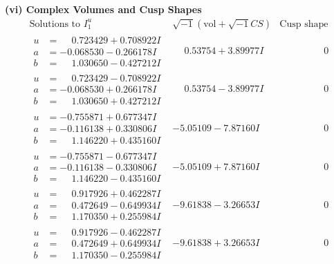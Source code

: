 \documentclass[1p]{elsarticle_modified}
\theoremstyle{definition}
\newcommand{\I}{\sqrt{-1}}
\begin{document}
\newpage\flushleft \textbf{(vi) Complex Volumes and Cusp Shapes}
$$\begin{array}{c|c|c}  
\text{Solutions to }I^u_{1}& \I (\text{vol} + \sqrt{-1}CS) & \text{Cusp shape}\\
 \hline 
\begin{aligned}
u &= \phantom{-}0.723429 + 0.708922 I \\
a &= -0.068530 - 0.266178 I \\
b &= \phantom{-}1.030650 - 0.427212 I\end{aligned}
 & \phantom{-}0.53754 + 3.89977 I & \phantom{-0.000000 } 0 \\ \hline\begin{aligned}
u &= \phantom{-}0.723429 - 0.708922 I \\
a &= -0.068530 + 0.266178 I \\
b &= \phantom{-}1.030650 + 0.427212 I\end{aligned}
 & \phantom{-}0.53754 - 3.89977 I & \phantom{-0.000000 } 0 \\ \hline\begin{aligned}
u &= -0.755871 + 0.677347 I \\
a &= -0.116138 + 0.330806 I \\
b &= \phantom{-}1.146220 + 0.435160 I\end{aligned}
 & -5.05109 - 7.87160 I & \phantom{-0.000000 } 0 \\ \hline\begin{aligned}
u &= -0.755871 - 0.677347 I \\
a &= -0.116138 - 0.330806 I \\
b &= \phantom{-}1.146220 - 0.435160 I\end{aligned}
 & -5.05109 + 7.87160 I & \phantom{-0.000000 } 0 \\ \hline\begin{aligned}
u &= \phantom{-}0.917926 + 0.462287 I \\
a &= \phantom{-}0.472649 - 0.649934 I \\
b &= \phantom{-}1.170350 + 0.255984 I\end{aligned}
 & -9.61838 - 3.26653 I & \phantom{-0.000000 } 0 \\ \hline\begin{aligned}
u &= \phantom{-}0.917926 - 0.462287 I \\
a &= \phantom{-}0.472649 + 0.649934 I \\
b &= \phantom{-}1.170350 - 0.255984 I\end{aligned}
 & -9.61838 + 3.26653 I & \phantom{-0.000000 } 0 \\ \hline\begin{aligned}

\end{aligned}
\end{array}$$
\end{document}
